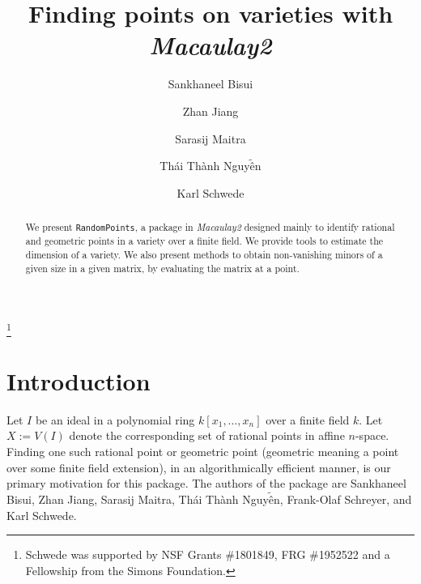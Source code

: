 \documentclass[11pt]{amsart}
\theoremstyle{definition}
\begin{document}
\title{Finding points on varieties with \emph{Macaulay2}}
\author{Sankhaneel Bisui}
\address{Department of Mathematics, Tulane University, New Orleans, LA 70118}
\author{Zhan Jiang}
\address{Department of Mathematics, University of Michigan, Ann Arbor, MI 48109}
\author{Sarasij Maitra}
\address{Department of Mathematics, University of Virginia, Charlottesville, VA 22904}
\author{Th\'ai Th\`anh Nguy$\tilde{\text{\^e}}$n}
\address{Department of Mathematics, Tulane University, New Orleans, LA 70118}
\author{Karl Schwede}
\address{Department of Mathematics, University of Utah, 155 S 1400 E Room 233, Salt Lake City, UT, 84112}

\thanks{Schwede was supported by NSF Grants \#1801849, FRG \#1952522 and a Fellowship from the Simons Foundation.}

\begin{abstract}
  We present {\tt RandomPoints}, a package in \emph{Macaulay2} designed mainly to identify rational and geometric points in a variety over a finite field.  We provide tools to estimate the dimension of a variety.  We also present methods to obtain non-vanishing minors of a given size in a given matrix, by evaluating the matrix at a point.  %
\end{abstract}



\maketitle

\section{Introduction}
    Let $I$ be an ideal in a polynomial ring $k[x_1,\dots, x_n]$ over a finite field $k$. Let $X:=V(I)$ denote the corresponding set of rational points in affine $n$-space. Finding one such rational point or geometric point (geometric meaning a point over some finite field extension), in an algorithmically efficient manner, is our primary motivation for this package. The authors of the package are Sankhaneel Bisui, Zhan Jiang, Sarasij Maitra, Th\'ai Th\`anh Nguy$\tilde{\text{\^e}}$n, Frank-Olaf Schreyer, and Karl Schwede.
\end{document}
